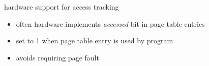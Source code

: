 \begin{frame}{hardware support for access tracking}
\begin{itemize}
    \item often hardware implements \textit{accessed} bit in page table entries
    \item set to 1 when page table entry is used by program
    \item avoids requiring page fault
\end{itemize}
\end{frame}

